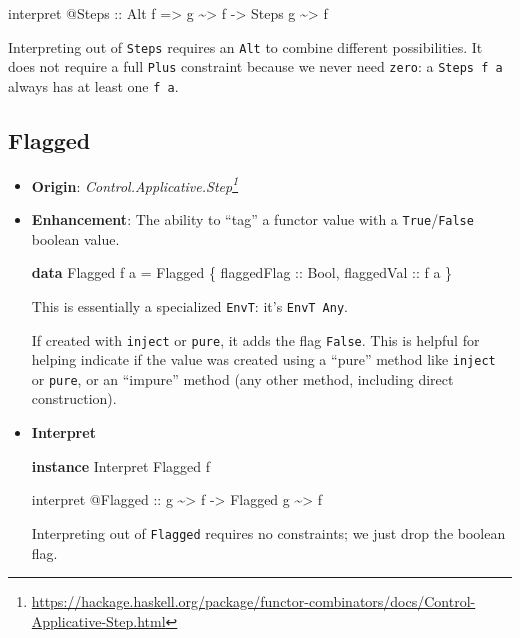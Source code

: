 \documentclass[]{article}
\newenvironment{Shaded}{}{}
\newcommand{\DataTypeTok}[1]{\textcolor[rgb]{0.56,0.13,0.00}{#1}}
\newcommand{\KeywordTok}[1]{\textcolor[rgb]{0.00,0.44,0.13}{\textbf{#1}}}
\newcommand{\NormalTok}[1]{#1}
\newcommand{\OperatorTok}[1]{\textcolor[rgb]{0.40,0.40,0.40}{#1}}
\newcommand{\OtherTok}[1]{\textcolor[rgb]{0.00,0.44,0.13}{#1}}
\renewcommand{\href}[2]{#2\footnote{\url{#1}}}
\begin{document}
\begin{itemize}
\begin{Shaded}
\begin{Highlighting}[]
\NormalTok{interpret }\OperatorTok{@}\DataTypeTok{Steps}
\OtherTok{    ::} \DataTypeTok{Alt}\NormalTok{ f}
    \OtherTok{=>}\NormalTok{ g }\OperatorTok{\textasciitilde{}>}\NormalTok{ f}
    \OtherTok{{-}>} \DataTypeTok{Steps}\NormalTok{ g }\OperatorTok{\textasciitilde{}>}\NormalTok{ f}
\end{Highlighting}
\end{Shaded}

  Interpreting out of \texttt{Steps} requires an \texttt{Alt} to combine
  different possibilities. It does not require a full \texttt{Plus} constraint
  because we never need \texttt{zero}: a \texttt{Steps\ f\ a} always has at
  least one \texttt{f\ a}.
\end{itemize}

\hypertarget{flagged}{%
\subsection{Flagged}\label{flagged}}

\begin{itemize}
\item
  \textbf{Origin}:
  \emph{\href{https://hackage.haskell.org/package/functor-combinators/docs/Control-Applicative-Step.html}{Control.Applicative.Step}}
\item
  \textbf{Enhancement}: The ability to ``tag'' a functor value with a
  \texttt{True}/\texttt{False} boolean value.

\begin{Shaded}
\begin{Highlighting}[]
\KeywordTok{data} \DataTypeTok{Flagged}\NormalTok{ f a }\OtherTok{=} \DataTypeTok{Flagged}\NormalTok{ \{}\OtherTok{ flaggedFlag ::} \DataTypeTok{Bool}\NormalTok{,}\OtherTok{ flaggedVal ::}\NormalTok{ f a \}}
\end{Highlighting}
\end{Shaded}

  This is essentially a specialized \texttt{EnvT}: it's \texttt{EnvT\ Any}.

  If created with \texttt{inject} or \texttt{pure}, it adds the flag
  \texttt{False}. This is helpful for helping indicate if the value was created
  using a ``pure'' method like \texttt{inject} or \texttt{pure}, or an
  ``impure'' method (any other method, including direct construction).
\item
  \textbf{Interpret}

\begin{Shaded}
\begin{Highlighting}[]
\KeywordTok{instance} \DataTypeTok{Interpret} \DataTypeTok{Flagged}\NormalTok{ f}

\NormalTok{interpret }\OperatorTok{@}\DataTypeTok{Flagged}
\OtherTok{    ::}\NormalTok{ g }\OperatorTok{\textasciitilde{}>}\NormalTok{ f}
    \OtherTok{{-}>} \DataTypeTok{Flagged}\NormalTok{ g }\OperatorTok{\textasciitilde{}>}\NormalTok{ f}
\end{Highlighting}
\end{Shaded}

  Interpreting out of \texttt{Flagged} requires no constraints; we just drop the
  boolean flag.
\end{itemize}
\end{document}
